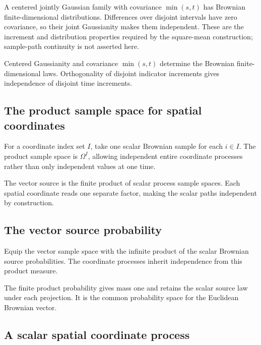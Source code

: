 \documentclass[11pt,a4paper]{report}
\begin{document}
A centered jointly Gaussian family with covariance \(\min(s,t)\) has Brownian finite-dimensional distributions. Differences over disjoint intervals have zero covariance, so their joint Gaussianity makes them independent. These are the increment and distribution properties required by the square-mean construction; sample-path continuity is not asserted here.



Centered Gaussianity and covariance \(\min(s,t)\) determine the Brownian finite-dimensional laws. Orthogonality of disjoint indicator increments gives independence of disjoint time increments.

\subsection{\texorpdfstring{The product sample space for spatial coordinates}{The product sample space for spatial coordinates}}
\label{report-step-UnadjustedLangevin-CanonicalBrownian-lean-16}


For a coordinate index set \(I\), take one scalar Brownian sample for each \(i\in I\). The product sample space is \(\Omega^I\), allowing independent entire coordinate processes rather than only independent values at one time.



The vector source is the finite product of scalar process sample spaces. Each spatial coordinate reads one separate factor, making the scalar paths independent by construction.

\subsection{\texorpdfstring{The vector source probability}{The vector source probability}}
\label{report-step-UnadjustedLangevin-CanonicalBrownian-lean-17}


Equip the vector sample space with the infinite product of the scalar Brownian source probabilities. The coordinate processes inherit independence from this product measure.



The finite product probability gives mass one and retains the scalar source law under each projection. It is the common probability space for the Euclidean Brownian vector.

\subsection{\texorpdfstring{A scalar spatial coordinate process}{A scalar spatial coordinate process}}
\label{report-step-UnadjustedLangevin-CanonicalBrownian-lean-18}
\end{document}

